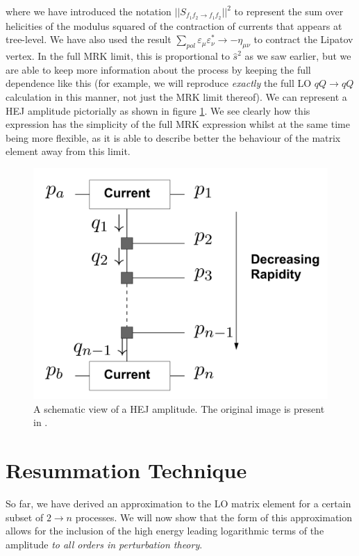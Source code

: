 where we have introduced the notation $||S_{f_1 f_2 \to f_1 f_2}||^2$ to represent the sum over helicities of the modulus squared of the contraction of currents that appears at tree-level. We have also used the result $\sum_{pol} \varepsilon_{\mu} \varepsilon_{\nu}^* \to -\eta_{\mu \nu}$ to contract the Lipatov vertex. In the full MRK limit, this is proportional to $\hat{s}^2$ as we saw earlier, but we are able to keep more information about the process by keeping the full dependence like this (for example, we will reproduce \emph{exactly} the full LO $qQ \to qQ$ calculation in this manner, not just the MRK limit thereof). We can represent a HEJ amplitude pictorially as shown in figure \ref{fig:hejamp}. We see clearly how this expression has the simplicity of the full MRK expression whilst at the same time being more flexible, as it is able to describe better the behaviour of the matrix element away from this limit. %

\begin{figure}[t]
\centering
\includegraphics[scale=0.35]{Images/hej_amp.png} 
\caption{A schematic view of a HEJ amplitude. The original image is present in \cite{Andersen2011a}.}
\label{fig:hejamp}
\end{figure}

\section{Resummation Technique}

So far, we have derived an approximation to the LO matrix element for a certain subset of $2 \to n$ processes. We will now show that the form of this approximation allows for the inclusion of the high energy leading logarithmic terms of the amplitude \emph{to all orders in perturbation theory}. 

